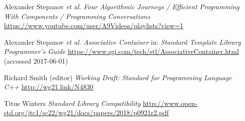 \documentclass[11pt]{article}
\begin{document}
\begin{thebibliography}{9}
  Alexander Stepanov \emph{et al.}\newline
  \emph{Four Algorithmic Journeys / Efficient Programming With Components /
    Programming Conversations}\newline
  \url{https://www.youtube.com/user/A9Videos/playlists?view=1}

  Alexander Stepanov \emph{et al.}\newline
  \emph{Associative Container}\newline
  in: \emph{Standard Template Library Programmer's Guide}\newline
  \url{https://www.sgi.com/tech/stl/AssociativeContainer.html} (accessed 2017-06-01)

  Richard Smith (editor)\newline
  \emph{Working Draft: Standard for Programming Language C++}\newline
  \url{http://wg21.link/N4830}

 Titus Winters\newline
  \emph{Standard Library Compatibility}\newline
  \url{http://www.open-std.org/jtc1/sc22/wg21/docs/papers/2018/p0921r2.pdf}
\end{thebibliography}
\end{document}
